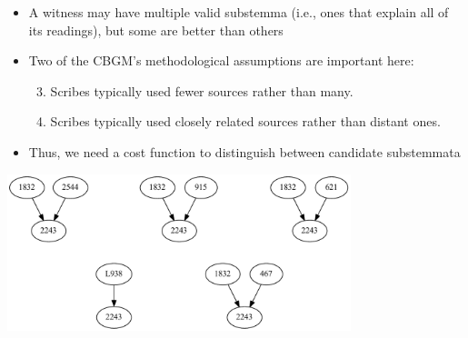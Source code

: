 \documentclass[10pt]{beamer}
\begin{document}
	\begin{frame}
		\begin{itemize}
			\item A witness may have multiple valid substemma (i.e., ones that explain all of its readings), but some are better than others
			\item Two of the CBGM's methodological assumptions are important here:
			\begin{enumerate}
				\setcounter{enumi}{2} %
				\item Scribes typically used fewer sources rather than many.
				\item Scribes typically used closely related sources rather than distant ones.
			\end{enumerate}
			\item Thus, we need a cost function to distinguish between candidate substemmata
		\end{itemize}
		\begin{center}
			\includegraphics[width=0.75\textwidth]{../img/substemmata.pdf}
		\end{center}
	\end{frame}
\end{document}
